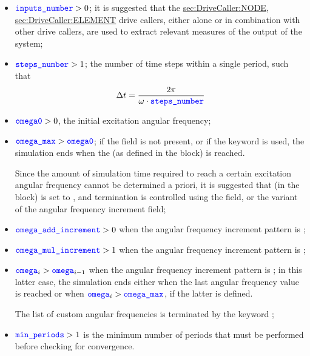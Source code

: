 \begin{itemize}
\item $\textcolor{blue}{\texttt{inputs\_number}} > 0$; it is suggested that the
\hyperref{\kw{node}}{\kw{node} (see Section~}{)}{sec:DriveCaller:NODE},
\hyperref{\kw{element}}{\kw{element} (see Section~}{)}{sec:DriveCaller:ELEMENT}
drive callers, either alone or in combination with other drive callers, are used to extract relevant measures of the output of the system;

\item $\textcolor{blue}{\texttt{steps\_number}} > 1$; the number of time steps within a single period, such that
\begin{align*}
	\Delta t = \frac{2 \pi}{\omega \cdot \textcolor{blue}{\texttt{steps\_number}}}
\end{align*}

\item $\textcolor{blue}{\texttt{omega0}} > 0$, the initial excitation angular frequency;

\item $\textcolor{blue}{\texttt{omega\_max}} > \textcolor{blue}{\texttt{omega0}}$; if the  field is not present, or if the keyword  is used, the simulation ends when the  (as defined in the  block) is reached.

Since the amount of simulation time required to reach a certain excitation angular frequency cannot be determined a priori, it is suggested that  (in the  block) is set to , and termination is controlled using the  field, or the  variant of the angular frequency increment field;

\item $\textcolor{blue}{\texttt{omega\_add\_increment}} > 0$ when the angular frequency increment pattern is ;

\item $\textcolor{blue}{\texttt{omega\_mul\_increment}} > 1$ when the angular frequency increment pattern is ;

\item $\textcolor{blue}{\texttt{omega}}_i > \textcolor{blue}{\texttt{omega}}_{i-1}$ when the angular frequency increment pattern is ; in this latter case, the simulation ends either when the last angular frequency value is reached or when $\textcolor{blue}{\texttt{omega}}_i > \textcolor{blue}{\texttt{omega\_max}}$, if the latter is defined.

The list of custom angular frequencies is terminated by the keyword ;

\item $\textcolor{blue}{\texttt{min\_periods}} > 1$ is the minimum number of periods that must be performed before checking for convergence.
\end{itemize}

